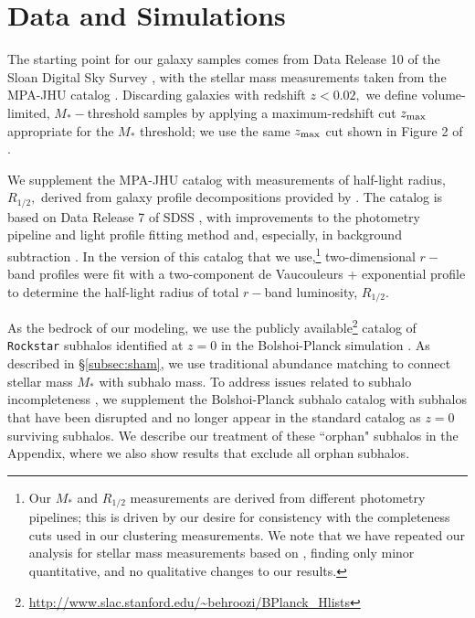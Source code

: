 \documentclass[usenatbib,usegraphicx,letterpaper]{mn2e}
\newcommand{\rhalf}{R_{1/2}}
\newcommand{\mstar}{M_{\ast}}
\begin{document}
\section{Data and Simulations}
\label{sec:data}

The starting point for our galaxy samples comes from Data Release 10 of the Sloan Digital Sky Survey \citep[SDSS,][]{ahn_etal14}, with the stellar mass measurements taken from the MPA-JHU catalog \citep{kauffmann_etal03,brinchmann_etal04}. Discarding galaxies with redshift $z<0.02,$ we define volume-limited, $\mstar-$threshold samples by applying a maximum-redshift cut $z_{\rm max}$ appropriate for the $\mstar$ threshold; we use the same $z_{\rm max}$ cut shown in Figure 2 of \citet{behroozi_etal15}.

We supplement the MPA-JHU catalog with measurements of half-light radius, $\rhalf,$ derived from galaxy profile decompositions provided by \citet{meert_etal15}. The \citet{meert_etal15} catalog is based on Data Release 7 of SDSS \citep{abazajian_etal09}, with improvements to the photometry pipeline and light profile fitting method and, especially, in background subtraction \citep{vikram_etal10,bernardi_etal13,bernardi_etal14,meert_etal13}. In the version of this catalog that we use,\footnote{Our $\mstar$ and $\rhalf$ measurements are derived from different photometry pipelines; this is driven by our desire for consistency with the \citet{behroozi_etal15} completeness cuts used in our clustering measurements. We note that we have repeated our analysis for stellar mass measurements based on \citet{meert_etal15}, finding only minor quantitative, and no qualitative changes to our results.} two-dimensional $r-$band profiles were fit with a two-component de Vaucouleurs + exponential profile to determine the half-light radius of total $r-$band luminosity, $\rhalf.$

As the bedrock of our modeling, we use the publicly available\footnote{\url{http://www.slac.stanford.edu/~behroozi/BPlanck\_Hlists}} catalog of {\tt Rockstar} subhalos identified at $z=0$ in the Bolshoi-Planck simulation \citep{klypin_etal11,klypin_etal16,behroozi12_rockstar,riebe_etal13,behroozi_etal12b,rodriguez_puebla16_bolplanck}. As described in \S\ref{subsec:sham}, we use traditional abundance matching to connect stellar mass $\mstar$ with subhalo mass. To address issues related to subhalo incompleteness \citep{guo_white13,campbell_etal17}, we supplement the Bolshoi-Planck subhalo catalog with subhalos that have been disrupted and no longer appear in the standard catalog as $z=0$ surviving subhalos. We describe our treatment of these ``orphan" subhalos in the Appendix, where we also show results that exclude all orphan subhalos. 
\end{document}
